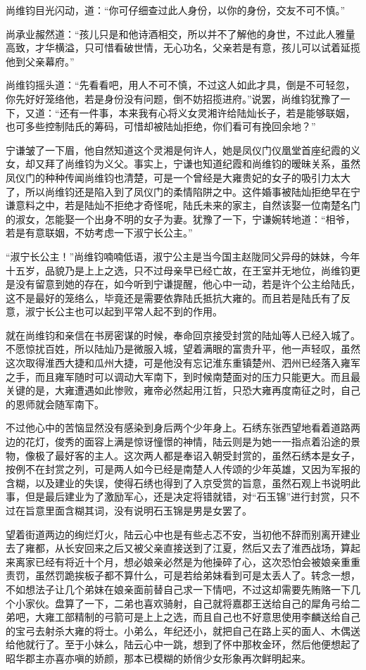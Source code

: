 尚维钧目光闪动，道：“你可仔细查过此人身份，以你的身份，交友不可不慎。”

尚承业赧然道：“孩儿只是和他诗酒相交，所以并不了解他的身世，不过此人雅量高致，才华横溢，只可惜看破世情，无心功名，父亲若是有意，孩儿可以试着延揽他到父亲幕府。”

尚维钧摇头道：“先看看吧，用人不可不慎，不过这人如此才具，倒是不可轻忽，你先好好笼络他，若是身份没有问题，倒不妨招揽进府。”说罢，尚维钧犹豫了一下，又道：“还有一件事，本来我有心将义女灵湘许给陆灿长子，若是能够联姻，也可多些控制陆氏的筹码，可惜却被陆灿拒绝，你们看可有挽回余地？”

宁谦皱了一下眉，他自然知道这个灵湘是何许人，她是凤仪门仪凰堂首座纪霞的义女，却又拜了尚维钧为义父。事实上，宁谦也知道纪霞和尚维钧的暧昧关系，虽然凤仪门的种种传闻尚维钧也清楚，可是一个曾经是大雍贵妃的女子的吸引力太大了，所以尚维钧还是陷入到了凤仪门的柔情陷阱之中。这件婚事被陆灿拒绝早在宁谦意料之中，若是陆灿不拒绝才奇怪呢，陆氏未来的家主，自然该娶一位南楚名门的淑女，怎能娶一个出身不明的女子为妻。犹豫了一下，宁谦婉转地道：“相爷，若是有意联姻，不妨考虑一下淑宁长公主。”

“淑宁长公主！”尚维钧喃喃低语，淑宁公主是当今国主赵陇同父异母的妹妹，今年十五岁，品貌乃是上上之选，只不过母亲早已经亡故，在王室并无地位，尚维钧更是没有留意到她的存在，如今听到宁谦提醒，他心中一动，若是许个公主给陆氏，这不是最好的笼络么，毕竟还是需要依靠陆氏抵抗大雍的。而且若是陆氏有了反意，淑宁长公主也可以起到平常人起不到的作用。

就在尚维钧和亲信在书房密谋的时候，奉命回京接受封赏的陆灿等人已经入城了。不愿惊扰百姓，所以陆灿乃是微服入城，望着满眼的富贵升平，他一声轻叹，虽然这次取得淮西大捷和瓜州大捷，可是他没有忘记淮东重镇楚州、泗州已经落入雍军之手，而且雍军随时可以调动大军南下，到时候南楚面对的压力只能更大。而且最关键的是，大雍遭遇如此惨败，雍帝必然起用江哲，只恐大雍再度南征之时，自己的恩师就会随军南下。

不过他心中的苦恼显然没有感染到身后两个少年身上。石绣东张西望地看着道路两边的花灯，俊秀的面容上满是惊讶憧憬的神情，陆云则是为她一一指点着沿途的景物，像极了最好客的主人。这次两人都是奉诏入朝受封赏的，虽然石绣本是女子，按例不在封赏之列，可是两人如今已经是南楚人人传颂的少年英雄，又因为军报的含糊，以及建业的失误，使得石绣也得到了入京受赏的旨意，虽然石观上书说明此事，但是最后建业为了激励军心，还是决定将错就错，对“石玉锦”进行封赏，只不过在旨意里面含糊其词，没有说明石玉锦是男是女罢了。

望着街道两边的绚烂灯火，陆云心中也是有些忐忑不安，当初他不辞而别离开建业去了雍都，从长安回来之后又被父亲直接送到了江夏，然后又去了淮西战场，算起来离家已经有将近十个月，想必娘亲必然是为他操碎了心，这次恐怕会被娘亲重重责罚，虽然罚跪挨板子都不算什么，可是若给弟妹看到可是太丢人了。转念一想，不如想法子让几个弟妹在娘亲面前替自己求一下情吧，不过这却需要先贿赂一下几个小家伙。盘算了一下，二弟也喜欢骑射，自己就将嘉郡王送给自己的犀角弓给二弟吧，大雍工部精制的弓箭可是上上之选，而且自己也不好意思使用李麟送给自己的宝弓去射杀大雍的将士。小弟么，年纪还小，就把自己在路上买的面人、木偶送给他就行了。至于小妹么，陆云心中一跳，想到了怀中那枚金环，然后他便想起了昭华郡主亦喜亦嗔的娇颜，那本已模糊的娇俏少女形象再次鲜明起来。

